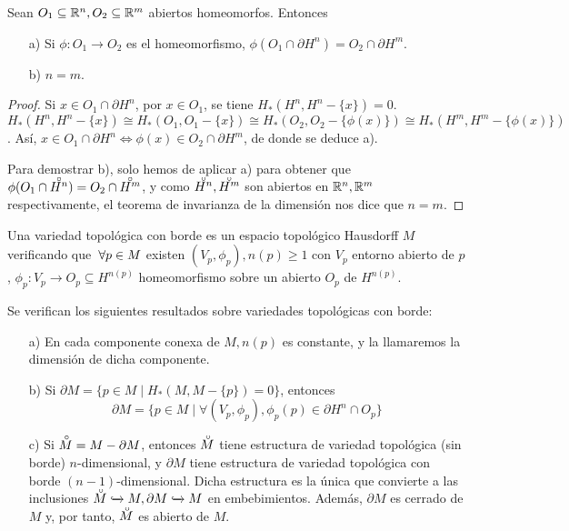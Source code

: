 \begin{corollary}
  Sean $O_1 \subseteq \mathbb{R}^n, O_2 \subseteq \mathbb{R}^m$ abiertos homeomorfos. Entonces
  \begin{itemize}
    \item [a)] Si $\phi \colon O_1 \to O_2$ es el homeomorfismo, $\phi(O_1 \cap \partial H^n) = O_2 \cap \partial H^m$.
    \item [b)] $n = m$.
  \end{itemize}
\end{corollary}

\begin{proof}
  Si $x \in O_1 \cap \partial H^n$, por $x \in O_1$, se tiene $H_*(H^n, H^n - \{x\}) = 0$. \\
  $H_*(H^n, H^n - \{x\}) \cong H_*(O_1, O_1 - \{x\}) \cong H_*(O_2, O_2 - \{\phi(x)\}) \cong H_*(H^m, H^m - \{\phi(x)\})$.
  Así, $x \in O_1 \cap \partial H^n \iff \phi(x) \in O_2 \cap \partial H^m$, de donde se deduce a).

  Para demostrar b), solo hemos de aplicar a) para obtener que $\phi(O_1 \cap \interior{H^n}) = O_2 \cap \interior{H^m}$, y como
  $\interior{H^n}, \interior{H^m}$ son abiertos en $\mathbb{R}^n, \mathbb{R}^m$ respectivamente, el teorema de invarianza de la dimensión
  nos dice que $n = m$.
\end{proof}

\begin{definition}
  Una variedad topológica con borde es un espacio topológico Hausdorff $M$ verificando que $\hspace{0.2em} \forall p \in M$ existen
  $(V_p, \phi_p), n(p) \geq 1$ con $V_p$ entorno abierto de $p$, $\phi_p \colon V_p \to O_p \subseteq H^{n(p)}$ homeomorfismo
  sobre un abierto $O_p$ de $H^{n(p)}$.
\end{definition}

\begin{proposition}[Consecuencias]
  Se verifican los siguientes resultados sobre variedades topológicas con borde:
  \begin{itemize}
    \item[a)] En cada componente conexa de $M, n(p)$ es constante, y la llamaremos la dimensión de dicha componente.

    \item[b)] Si $\partial M = \{p \in M \mid H_*(M, M - \{p\}) = 0\}$, entonces
    \[ \partial M = \{p \in M \mid \forall (V_p, \phi_p), \phi_p(p) \in \partial H^n \cap O_p\} \]

    \item[c)] Si $\interior{M} = M - \partial M$, entonces $\interior{M}$ tiene estructura de variedad topológica
    (sin borde) $n$-dimensional, y $\partial M$ tiene estructura de variedad topológica con borde $(n-1)$-dimensional.
    Dicha estructura es la única que convierte a las inclusiones $\interior{M} \xhookrightarrow{} M, \partial M \xhookrightarrow{} M$
    en embebimientos. Además, $\partial M$ es cerrado de $M$ y, por tanto, $\interior{M}$ es abierto de $M$.
  \end{itemize}
\end{proposition}

